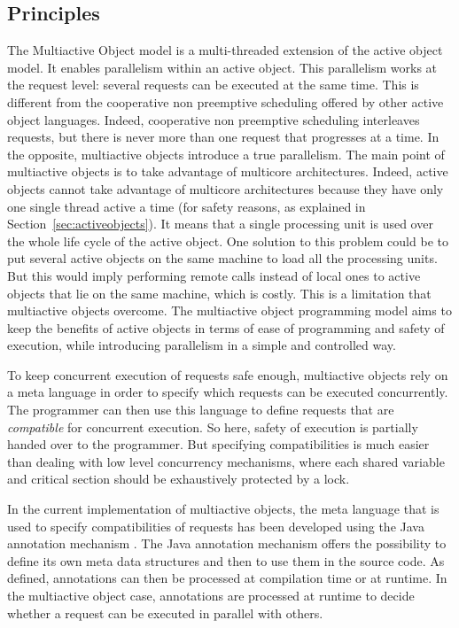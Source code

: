 \documentclass[11pt]{report}
\begin{document}
\subsection{Principles}\label{sec:MAOprinciples}
The Multiactive Object model \cite{ref:mao} is a multi-threaded extension of the active object model. It enables parallelism within an active object. This parallelism works at the request level: several requests can be executed at the same time. This is different from the cooperative non preemptive scheduling offered by other active object languages. Indeed, cooperative non preemptive scheduling interleaves requests, but there is never more than one request that progresses at a time. In the opposite, multiactive objects introduce a true parallelism. The main point of multiactive objects is to take advantage of multicore architectures. Indeed, active objects cannot take advantage of multicore architectures because they have only one single thread active a time (for safety reasons, as explained in Section~\ref{sec:activeobjects}). It means that a single processing unit is used over the whole life cycle of the active object. One solution to this problem could be to put several active objects on the same machine to load all the processing units. But this would imply performing remote calls instead of local ones to active objects that lie on the same machine, which is costly. This is a limitation that multiactive objects overcome.
The multiactive object programming model aims to keep the benefits of active objects in terms of ease of programming and safety of execution, while introducing parallelism in a simple and controlled way. 

To keep concurrent execution of requests safe enough, multiactive objects rely on a meta language in order to specify which requests can be executed concurrently. The programmer can then use this language to define requests that are \emph{compatible} for concurrent execution. So here, safety of execution is partially handed over to the programmer. But specifying compatibilities is much easier than dealing with low level concurrency mechanisms, where each shared variable and critical section should be exhaustively protected by a lock.

In the current implementation of multiactive objects, the meta language that is used to specify compatibilities of requests has been developed using the Java annotation mechanism \cite{ref:annotations}. The Java annotation mechanism offers the possibility to define its own meta data structures and then to use them in the source code. As defined, annotations can then be processed at compilation time or at runtime.
In the multiactive object case, annotations are processed at runtime to decide whether a request can be executed in parallel with others.
\end{document}
